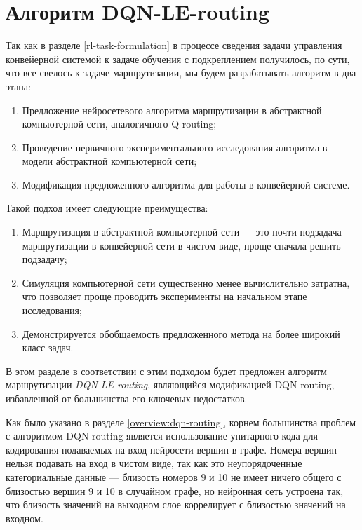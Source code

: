\documentclass[specification,annotation,times]{itmo-student-thesis}
\theoremstyle{definition}
\begin{document}
\section{Алгоритм DQN-LE-routing}

Так как в разделе \ref{rl-task-formulation} в процессе сведения задачи
управления конвейерной системой к задаче обучения с подкреплением получилось, по
сути, что все свелось к задаче маршрутизации, мы будем разрабатывать алгоритм в
два этапа:

\begin{enumerate}
\item Предложение нейросетевого алгоритма маршрутизации в абстрактной
  компьютерной сети, аналогичного Q-routing;
\item Проведение первичного экспериментального исследования алгоритма в модели
  абстрактной компьютерной сети;
\item Модификация предложенного алгоритма для работы в
  конвейерной системе.
\end{enumerate}

Такой подход имеет следующие преимущества:

\begin{enumerate}
\item Маршрутизация в абстрактной компьютерной сети --- это почти подзадача
  маршрутизации в конвейерной сети в чистом виде, проще сначала решить подзадачу;
\item Симуляция компьютерной сети существенно менее вычислительно затратна, что
  позволяет проще проводить эксперименты на начальном этапе исследования;
\item Демонстрируется обобщаемость предложенного метода на более широкий класс
  задач.
\end{enumerate}

В этом разделе в соответствии с этим подходом будет предложен алгоритм
маршрутизации \textit{DQN-LE-routing}, являющийся модификацией DQN-routing,
избавленной от большинства его ключевых недостатков.

Как было указано в разделе \ref{overview:dqn-routing}, корнем большинства проблем с алгоритмом
DQN-routing является использование унитарного кода для кодирования подаваемых на
вход нейросети вершин в графе. Номера вершин нельзя подавать на вход в чистом
виде, так как это неупорядоченные категориальные данные --- близость номеров 9 и
10 не имеет ничего общего с близостью вершин 9 и 10 в случайном графе, но
нейронная сеть устроена так, что близость значений на выходном слое коррелирует
с близостью значений на входном.
\end{document}
